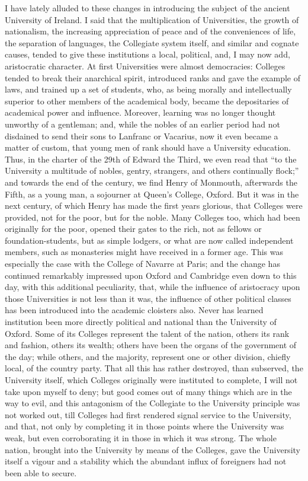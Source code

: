 I have lately alluded to these
changes in introducing the subject of the ancient University of
Ireland. I said that the multiplication of Universities, the growth of
nationalism, the increasing appreciation of peace and of the
conveniences of life, the separation of languages, the Collegiate
system itself, and similar and cognate causes, tended to give these
institutions a local, political, and, I may now add, aristocratic
character. At first Universities were almost democracies: Colleges
tended to break their anarchical spirit, introduced ranks and gave the
example of laws, and trained up a set of students, who, as being
morally and intellectually superior to other members of the academical
body, became the depositaries of academical power and influence.
Moreover, learning was no longer thought unworthy of a gentleman; and,
while the nobles of an earlier period had not disdained to send their
sons to Lanfranc or Vacarius, now it even became a matter of custom,
that young men of rank should have a University education. Thus, in
the charter of the 29th of Edward the Third, we even read that ``to
the University a multitude of nobles, gentry, strangers, and others
continually flock;'' and towards the end of the century, we find
Henry of Monmouth, afterwards the Fifth, as a young man, a sojourner
at Queen's College, Oxford. But it was in the next century, of which
Henry has made the first years glorious, that Colleges were provided,
not for the poor, but for the noble. Many Colleges too, which had been
originally for the poor, opened their gates to the rich, not as
fellows or foundation-students, but as simple lodgers, or what are now
called independent members, such as monasteries might have received in
a former age. This was especially the case with the College of Navarre
at Paris; and the change has continued remarkably impressed upon
Oxford and Cambridge even down to this day, with this additional
peculiarity, that, while the influence of aristocracy upon those
Universities is not less than it was, the influence of other political
classes has been introduced into the academic cloisters also. Never
has learned institution been more directly political and national than
the University of Oxford. Some of its Colleges represent the talent of
the nation, others its rank and fashion, others its wealth; others
have been the organs of the government of the day; while others, and
the majority, represent one or other division, chiefly local, of the
country party. That all this has rather destroyed, than subserved, the
University itself, which Colleges originally were instituted to
complete, I will not take upon myself to deny; but good comes out of
many things which are in the way to evil, and this antagonism of the
Collegiate to the University principle was not worked out, till
Colleges had first rendered signal service to the University, and
that, not only by completing it in those points where the University
was weak, but even corroborating it in those in which it was strong.
The whole nation, brought into the University by means of the
Colleges, gave the University itself a vigour and a stability which
the abundant influx of foreigners had not been able to secure.

